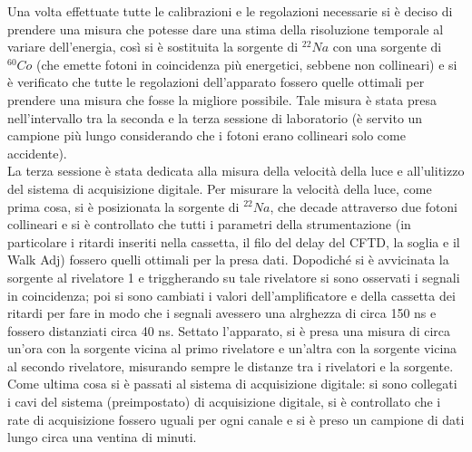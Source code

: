 Una volta effettuate tutte le calibrazioni e le regolazioni necessarie si è deciso di prendere una misura che potesse dare una stima della risoluzione temporale al
variare dell'energia, così si è sostituita la sorgente di $^{22}Na$ con una sorgente di $^{60}Co$ (che emette fotoni in coincidenza più energetici, sebbene non collineari)
e si è verificato che tutte le regolazioni dell'apparato fossero quelle ottimali per prendere una misura che fosse la migliore possibile. Tale misura è stata presa
nell'intervallo tra la seconda e la terza sessione di laboratorio (è servito un campione più  lungo considerando che i fotoni erano collineari solo come accidente).\\

La terza sessione è stata dedicata alla misura della velocità della luce e all'ulitizzo del sistema di acquisizione digitale. Per misurare la velocità della luce,
come prima cosa, si è posizionata la sorgente di $^{22}Na$, che decade attraverso due fotoni collineari e si è controllato che tutti i parametri della strumentazione
(in particolare i ritardi inseriti nella cassetta, il filo del delay del CFTD, la soglia e il Walk Adj) fossero quelli ottimali per la presa dati. Dopodiché
si è avvicinata la sorgente al rivelatore 1 e triggherando su tale rivelatore si sono osservati i segnali in coincidenza; poi si sono cambiati i valori dell'amplificatore
e della cassetta dei ritardi per fare in modo che i segnali avessero una alrghezza di circa 150 ns e fossero distanziati circa 40 ns. Settato l'apparato, si è presa una
misura di circa un'ora con la sorgente vicina al primo rivelatore e un'altra con la sorgente vicina al secondo rivelatore, misurando sempre le distanze tra i rivelatori
e la sorgente.\\

Come ultima cosa si è passati al sistema di acquisizione digitale: si sono collegati i cavi del sistema (preimpostato) di acquisizione digitale, si è controllato che
i rate di acquisizione fossero uguali per ogni canale e si è preso un campione di dati lungo circa una ventina di minuti.
